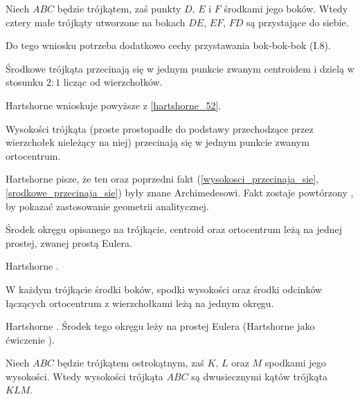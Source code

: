 \begin{corollary}
	Niech $ABC$ będzie trójkątem, zaś punkty $D$, $E$ i $F$ środkami jego boków.
	Wtedy cztery małe trójkąty utworzone na bokach $DE$, $EF$, $FD$ są przystające do siebie.
\end{corollary}

Do tego wniosku potrzeba dodatkowo cechy przystawania bok-bok-bok (I.8).

\begin{proposition}
	\label{srodkowe_przecinaja_sie}
	Środkowe trójkąta przecinają się w jednym punkcie zwanym centroidem i dzielą w stosunku $2 : 1$ licząc od wierzchołków.
\end{proposition}

Hartshorne \cite[s. 53, 54]{hartshorne2000} wnioskuje powyższe z \ref{hartshorne_52}.

\begin{proposition}
	\label{wysokosci_przecinaja_sie}
	Wysokości trójkąta (proste prostopadłe do podstawy przechodzące przez wierzchołek nieleżący na niej) przecinają się w jednym punkcie zwanym ortocentrum.
\end{proposition}

Hartshorne \cite[s. 52, 54]{hartshorne2000} pisze, że ten oraz poprzedni fakt (\ref{wysokosci_przecinaja_sie}, \ref{srodkowe_przecinaja_sie}) były znane Archimedesowi.
Fakt zostaje powtórzony \cite[s. 119-120]{hartshorne2000}, by pokazać zastosowanie geometrii analitycznej.

\begin{proposition}
	\label{prosta_eulera}
	Środek okręgu opisanego na trójkącie, centroid oraz ortocentrum leżą na jednej prostej, zwanej prostą Eulera.
\end{proposition}

Hartshorne \cite[s. 54, 55]{hartshorne2000}.

\begin{proposition}
	\label{okrag_dziewieciu_punktow}
	W każdym trójkącie środki boków, spodki wysokości oraz środki odcinków łączących ortocentrum z wierzchołkami leżą na jednym okręgu.
\end{proposition}

Hartshorne \cite[s. 57]{hartshorne2000}.
Środek tego okręgu leży na prostej Eulera (Hartshorne jako ćwiczenie \cite[s. 60]{hartshorne2000}).

\begin{proposition}
	\label{orthic_triangle}
	Niech $ABC$ będzie trójkątem ostrokątnym, zaś $K$, $L$ oraz $M$ spodkami jego wysokości.
	Wtedy wysokości trójkąta $ABC$ są dwusiecznymi kątów trójkąta $KLM$.
\end{proposition}

